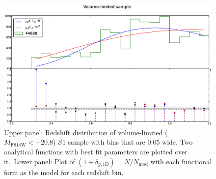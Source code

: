 \documentclass[twocolumn,useAMS,usenatbib]{mn2e}
\newcommand{\s}{\ensuremath{\mathcal{S}}}
\begin{document}
\begin{figure}
 \centering
  \includegraphics[width=\columnwidth]{redshift_vollimited}
  \caption{Upper panel: Redshift distribution of volume-limited ($M_\text{F814W} <  -20.8$) \s$1$ sample with bins that are 0.05 wide. Two analytical functions with best fit parameters are plotted over it.\
           Lower panel: Plot of $(1+\delta_{g,\text{1D}}) = N/N_{\text{mod}}$ with each functional form as the model for each redshift bin.}
  \label{fig:redshift_vollimited}
\end{figure}

  
\end{document}
